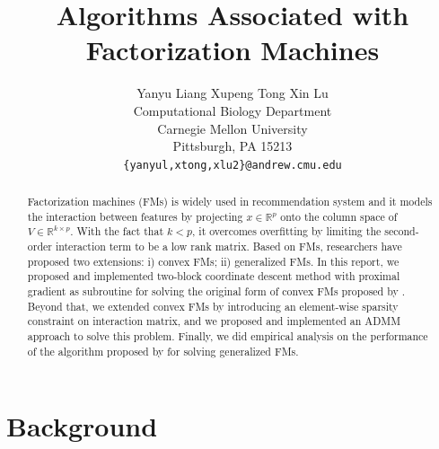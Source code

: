 \documentclass{article}
\title{Algorithms Associated with Factorization Machines}
\author{
  Yanyu Liang \quad Xupeng Tong \quad Xin Lu\\
  Computational Biology Department\\
  Carnegie Mellon University\\
  Pittsburgh, PA 15213 \\
  \texttt{\{yanyul,xtong,xlu2\}@andrew.cmu.edu} \\
}
\begin{document}

\maketitle

\begin{abstract}
  Factorization machines (FMs) is widely used in recommendation system and it models the interaction between features by projecting $x \in \mathbb{R}^{p}$ onto the column space of $V \in \mathbb{R}^{k \times p}$. With the fact that $k < p$, it overcomes overfitting by limiting the second-order interaction term to be a low rank matrix. Based on FMs, researchers have proposed two extensions: i) convex FMs; ii) generalized FMs. In this report, we proposed and implemented two-block coordinate descent method with proximal gradient as subroutine for solving the original form of convex FMs proposed by \cite{convexFM_paper}. Beyond that, we extended convex FMs by introducing an element-wise sparsity constraint on interaction matrix, and we proposed and implemented an ADMM approach to solve this problem. Finally, we did empirical analysis on the performance of the algorithm proposed by \cite{generalizedFM_paper} for solving generalized FMs.
\end{abstract}

\section{Background}
\end{document}
